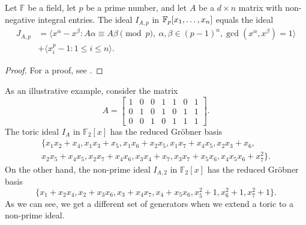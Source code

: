 \documentclass[english,bachelor]{liumaiex}
\begin{document}
\begin{prop}
Let $\mathbb{F}$ be a field, let $p$ be a prime number, and let $A$ be a $d\times n$ matrix with non-negative integral entries. The ideal $I_{A,p}$ in $\mathbb{F}_p[x_1,\dots,x_n]$ equals the ideal
\begin{align*}
J_{A,p}&= \langle x^\alpha-x^\beta\colon A\alpha\equiv A\beta\pmod p, \ \alpha,\beta \in (p-1)^n, \gcd(x^\alpha,x^\beta)=1\rangle\\ &+ \langle x_i^p-1\colon 1\leq i\leq n\rangle.
\end{align*}
\end{prop}
\begin{proof}
For a proof, see \cite[pp. 53-54]{phd}.
\end{proof}
As an illustrative example, consider the matrix
\begin{displaymath}
A=
\begin{bmatrix}
1 & 0 & 0 & 1 & 1 & 0 & 1\\
0 & 1 & 0 & 1 & 0 & 1 & 1\\
0 & 0 & 1 & 0 & 1 & 1 & 1
\end{bmatrix}.
\end{displaymath}
The toric ideal $I_A$ in $\mathbb{F}_2[x]$ has the reduced Gröbner basis
\begin{displaymath}
\begin{matrix}
\{x_1x_2+x_4,x_1x_3+x_5,x_1x_6+x_2x_5,x_1x_7+x_4x_5,x_2x_3+x_6,\\
x_2x_5+x_4x_5,x_2x_7+x_4x_6,x_3x_4+x_7,x_3x_7+x_5x_6,x_4x_5x_6+x_7^2\}.
\end{matrix}
\end{displaymath}
On the other hand, the non-prime ideal $I_{A,2}$ in $\mathbb{F}_2[x]$ has the reduced Gröbner basis
\begin{displaymath}
\{x_1+x_2x_4,x_2+x_3x_6,x_3+x_4x_7,x_4+x_5x_6,x_5^2+1,x_6^2+1,x_7^2+1\}.
\end{displaymath}
As we can see, we get a different set of generators when we extend a toric to a non-prime ideal.
\end{document}
